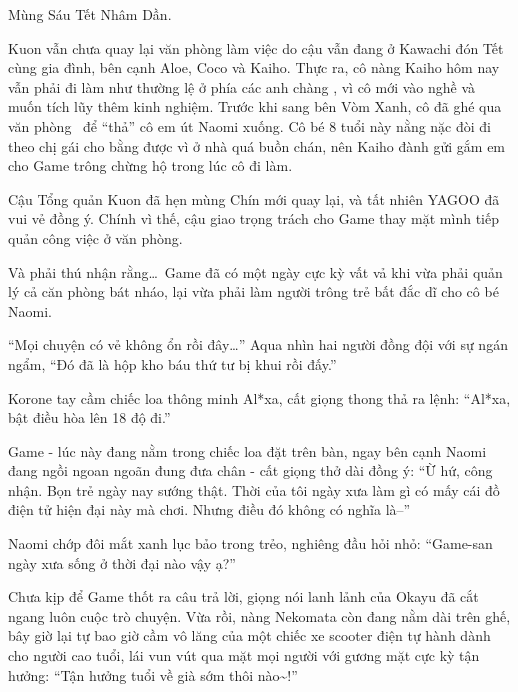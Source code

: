 \documentclass[../main.tex]{subfiles}
\begin{document}
\color{black}


Mùng Sáu Tết Nhâm Dần.

Kuon vẫn chưa quay lại văn phòng làm việc do cậu vẫn đang ở Kawachi đón Tết cùng gia đình, bên cạnh Aloe, Coco và Kaiho. Thực ra, cô nàng Kaiho hôm nay vẫn phải đi làm như thường lệ ở phía các anh chàng \hls, vì cô mới vào nghề và muốn tích lũy thêm kinh nghiệm. Trước khi sang bên Vòm Xanh, cô đã ghé qua văn phòng \hll\ để ``thả'' cô em út Naomi xuống. Cô bé 8 tuổi này nằng nặc đòi đi theo chị gái cho bằng được vì ở nhà quá buồn chán, nên Kaiho đành gửi gắm em cho Game trông chừng hộ trong lúc cô đi làm.

Cậu Tổng quản Kuon đã hẹn mùng Chín mới quay lại, và tất nhiên YAGOO đã vui vẻ đồng ý. Chính vì thế, cậu giao trọng trách cho Game thay mặt mình tiếp quản công việc ở văn phòng.

Và phải thú nhận rằng\dots\ Game đã có một ngày cực kỳ vất vả khi vừa phải quản lý cả căn phòng bát nháo, lại vừa phải làm người trông trẻ bất đắc dĩ cho cô bé Naomi.

\il

``Mọi chuyện có vẻ không ổn rồi đây\dots'' Aqua nhìn hai người đồng đội với sự ngán ngẩm, ``Đó đã là hộp kho báu thứ tư bị khui rồi đấy.''

Korone tay cầm chiếc loa thông minh Al*xa, cất giọng thong thả ra lệnh: ``Al*xa, bật điều hòa lên 18 độ đi.''

Game - lúc này đang nằm trong chiếc loa đặt trên bàn, ngay bên cạnh Naomi đang ngồi ngoan ngoãn đung đưa chân - cất giọng thở dài đồng ý: ``Ừ hứ, công nhận. Bọn trẻ ngày nay sướng thật. Thời của tôi ngày xưa làm gì có mấy cái đồ điện tử hiện đại này mà chơi. Nhưng điều đó không có nghĩa là--''

Naomi chớp đôi mắt xanh lục bảo trong trẻo, nghiêng đầu hỏi nhỏ: ``Game-san ngày xưa sống ở thời đại nào vậy ạ?''

Chưa kịp để Game thốt ra câu trả lời, giọng nói lanh lảnh của Okayu đã cắt ngang luôn cuộc trò chuyện. Vừa rồi, nàng Nekomata còn đang nằm dài trên ghế, bây giờ lại tự bao giờ cầm vô lăng của một chiếc xe scooter điện tự hành dành cho người cao tuổi, lái vun vút qua mặt mọi người với gương mặt cực kỳ tận hưởng: ``Tận hưởng tuổi về già sớm thôi nào\~{}!''
\end{document}
